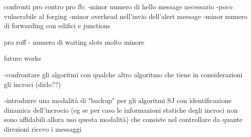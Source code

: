 


confronti pro contro
pro fb:
-minor numero di hello message necessario
-poco vulnerabile al forging
-minor overhead nell'invio dell'alert message
-minor numero di forwarding con edifici e junctions


pro roff
- numero di waiting slots molto minore





future works

-confrontare gli algoritmi con qualche altro algoritmo che tiene in considerazioni gli incroci (dirlo??)

-introdurre una modalità di "backup" per gli algoritmi SJ con identificazione dinamica dell'incrocio (eg se per caso le informazioni statiche degli incroci non sono affidabili allora uso questa modalità) che consiste nel controllare da quante direzioni ricevo i messaggi


